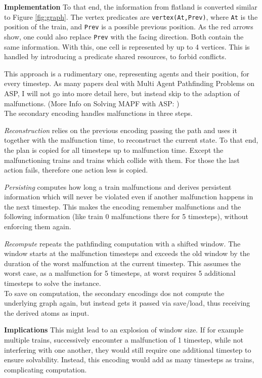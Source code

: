 \noindent \textbf{Implementation} To that end, the information from flatland is converted similar to Figure \ref{fig:graph}. The vertex predicates are \texttt{vertex(At,Prev)}, where \texttt{At} is the position of the train, and \texttt{Prev} is a possible previous position. As the red arrows show, one could also replace \texttt{Prev} with the facing direction. Both contain the same information. With this, one cell is represented by up to 4 vertices. This is handled by introducing a predicate shared resources, to forbid conflicts.

This approach is a rudimentary one, representing agents and their position, for every timestep. As many papers deal with Multi Agent Pathfinding Problems on ASP, I will not go into more detail here, but instead skip to the adaption of malfunctions. (More Info on Solving MAPF with ASP: \cite{MAPF})\\

\noindent The secondary encoding handles malfunctions in three steps.

\textit{Reconstruction} relies on the previous encoding passing the path and uses it together with the malfunction time, to reconstruct the current state. To that end, the plan is copied for all timesteps up to malfunction time. Except the malfunctioning trains and trains which collide with them. For those the last action fails, therefore one action less is copied. 

\textit{Persisting} computes how long a train malfunctions and derives persistent information which will never be violated even if another malfunction happens in the next timestep. This makes the encoding remember malfunctions and the following information (like train 0 malfunctions there for 5 timesteps), without enforcing them again.

\textit{Recompute} repeats the pathfinding computation with a shifted window. The window starts at the malfunction timesteps and exceeds the old window by the duration of the worst malfunction at the current timestep. This assumes the worst case, as a malfunction for 5 timesteps, at worst requires 5 additional timesteps to solve the instance.\\

To save on computation, the secondary encodings dos not compute the underlying graph again, but instead gets it passed via save/load, thus receiving the derived atoms as input.

\noindent \textbf{Implications} This might lead to an explosion of window size. If for example multiple trains, successively encounter a malfunction of 1 timestep, while not interfering with one another, they would still require one additional timestep to ensure solvability. Instead, this encoding would add as many timesteps as trains, complicating computation.

